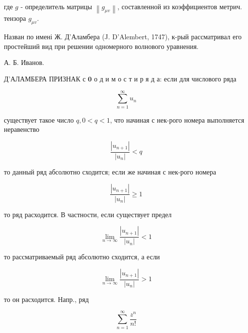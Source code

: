 \documentclass[10pt]{article}
\begin{document}
где $g$ - определитель матрицы $\left\|g_{\mu v}\right\|$, составленной из коэффициентов метрич. тензора $g_{\mu v}$.



Назван по имені Ж. Д'Аламбера (J. D'Alembert, 1747), к-рый рассматривал его простейший вид при решении одномерного волнового уравнения.



А. Б. Иванов.



Д'АЛАМБЕРА ПРИЗНАК с $\mathbf{0}$ о д и м о с т и р я д а: если для числового ряда



\[

\sum_{n=1}^{\infty} u_{n}

\]



существует такое число $q, 0<q<1$, что начиная с нек-рого номера выполняется неравенство



\[

\frac{\left|u_{n+1}\right|}{\left|u_{n}\right|}<q

\]



то данный ряд абсолютно сходится; если же начиная с нек-рого номера



\[

\frac{\left|u_{n+1}\right|}{\left|u_{n}\right|} \geqslant 1

\]



то ряд расходится. В частности, если существует предел



\[

\lim _{n \rightarrow \infty} \frac{\left|u_{n+1}\right|}{\left|u_{n}\right|}<1

\]



то рассматриваемый ряд абсолютно сходится, а если



\[

\lim _{n \rightarrow \infty} \frac{\left|u_{n+1}\right|}{\left|u_{n}\right|}>1

\]



то он расходится. Напр., ряд



\[

\sum_{n=1}^{\infty} \frac{z^{n}}{n !}

\]
\end{document}

